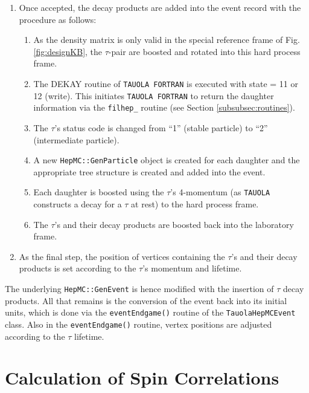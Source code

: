 \documentclass[]{Tauola_interface_design}
\begin{document}
\begin{enumerate}
\item Once accepted, the decay products are added into the event record with the procedure
      as follows:

  \begin{enumerate}
  
\item As the density matrix is only valid in the special reference
  frame of Fig. \ref{fig:designKB}, the $\tau$-pair are boosted and rotated into this hard process frame.

\item The DEKAY routine of {\tt TAUOLA FORTRAN} is executed with state = 11 or 12
  (write). This initiates {\tt TAUOLA FORTRAN} to return the daughter
  information via the {\tt filhep\_} routine (see Section \ref{subsubsec:routines}).

\item The $\tau$'s status code is changed from ``1'' (stable particle)
  to ``2'' (intermediate particle).

\item A new {\tt HepMC::GenParticle} object is created for each daughter and the
  appropriate tree structure is created and added into the event.

\item Each daughter is boosted using the $\tau$'s 4-momentum
  (as {\tt TAUOLA} constructs a decay for a $\tau$ at rest) to the hard process frame. 

\item The $\tau$'s and their decay products are boosted back into the
  laboratory frame.

\end{enumerate}

\item As the final step, the position of vertices containing the $\tau$'s and their decay products
      is set according to the $\tau$'s momentum and lifetime.

\end{enumerate}

The underlying {\tt HepMC::GenEvent} is hence modified with the insertion of  $\tau$ decay products.
All that remains is the conversion of the event back into its initial units, which is done
via the {\tt eventEndgame()} routine of the {\tt TauolaHepMCEvent} class. Also in the {\tt eventEndgame()} 
routine, vertex positions are adjusted according to the $\tau$ lifetime.


\section{Calculation of Spin Correlations}
\label{dwaTrzy}
\end{document}
